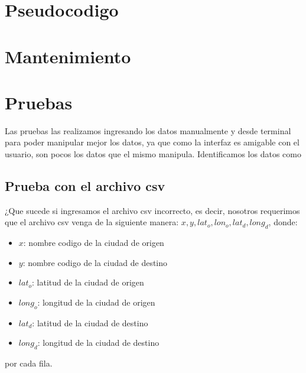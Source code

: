 \documentclass[12pt]{article}
\begin{document}
\section{Pseudocodigo}
\begin{algorithmic}[1]
  \EndIf
  \EndIf
  \EndFor
  \EndFor

  \EndIf
  \Else
  \EndIf
  \EndFunction
\end{algorithmic}
\section{Mantenimiento}
\section{Pruebas}
Las pruebas las realizamos ingresando los datos manualmente y desde terminal para poder manipular mejor los datos, ya que como la interfaz es amigable con el usuario, son pocos los datos que el mismo manipula. Identificamos los datos como 
\subsection{Prueba con el archivo csv}
¿Que sucede si ingresamos el archivo csv incorrecto, es decir, nosotros requerimos que el archivo csv venga de la siguiente manera: $x,y,lat_o,lon_o,lat_d, long_d$, donde:
\begin{itemize}
\item $x$: nombre codigo de la ciudad de origen
\item $y$: nombre codigo de la ciudad de destino
\item $lat_o$: latitud de la ciudad de origen
\item $long_o$: longitud de la ciudad de origen
\item $lat_d$: latitud de la ciudad de destino
\item $long_d$: longitud de la ciudad de destino
\end{itemize}
por cada fila.
\end{document}
